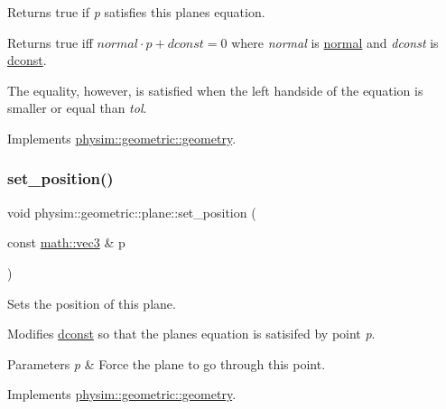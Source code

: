 Returns true if {\itshape p} satisfies this plane\textquotesingle{}s equation. 

Returns true iff $normal \cdot p + dconst = 0$ where {\itshape normal} is \hyperlink{classphysim_1_1geometric_1_1plane_a373cd794f689cf83458f6c6f051b59d9}{normal} and {\itshape dconst} is \hyperlink{classphysim_1_1geometric_1_1plane_a940e09edec2fddf9b8de42d6f6826c1f}{dconst}.

The equality, however, is satisfied when the left handside of the equation is smaller or equal than {\itshape tol}. 

Implements \hyperlink{classphysim_1_1geometric_1_1geometry_a325d4049d4e14584b389a2f1202bdc08}{physim\+::geometric\+::geometry}.

\mbox{\label{classphysim_1_1geometric_1_1plane_a201455ce1b4493b02b2f0c14e7d57e71}} 
\subsubsection{\texorpdfstring{set\+\_\+position()}{set\_position()}}
{\footnotesize\ttfamily void physim\+::geometric\+::plane\+::set\+\_\+position (\begin{DoxyParamCaption}\item[{const \hyperlink{structphysim_1_1math_1_1vec3}{math\+::vec3} \&}]{p }\end{DoxyParamCaption})\hspace{0.3cm}{\ttfamily [virtual]}}



Sets the position of this plane. 

Modifies \hyperlink{classphysim_1_1geometric_1_1plane_a940e09edec2fddf9b8de42d6f6826c1f}{dconst} so that the plane\textquotesingle{}s equation is satisifed by point {\itshape p}. 
\begin{DoxyParams}{Parameters}
{\em p} & Force the plane to go through this point. \\
\hline
\end{DoxyParams}


Implements \hyperlink{classphysim_1_1geometric_1_1geometry_a5b029b5fa8e55847d5aa06b1d341c88c}{physim\+::geometric\+::geometry}.

\mbox{\label{classphysim_1_1geometric_1_1plane_a9dc212ff39713d1525550c0bf328fe3a}} 
